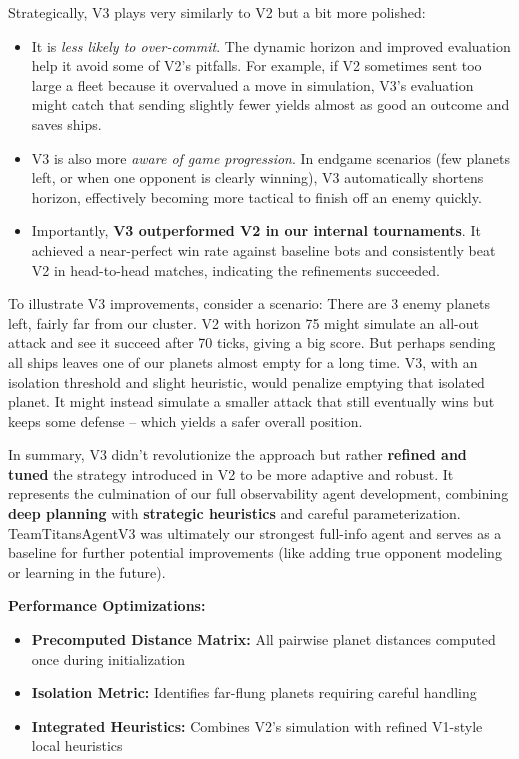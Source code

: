 \documentclass[conference]{IEEEtran}
\begin{document}
Strategically, V3 plays very similarly to V2 but a bit more polished:

\begin{itemize}
\item It is \textit{less likely to over-commit}. The dynamic horizon and improved evaluation help it avoid some of V2's pitfalls. For example, if V2 sometimes sent too large a fleet because it overvalued a move in simulation, V3's evaluation might catch that sending slightly fewer yields almost as good an outcome and saves ships.

\item V3 is also more \textit{aware of game progression}. In endgame scenarios (few planets left, or when one opponent is clearly winning), V3 automatically shortens horizon, effectively becoming more tactical to finish off an enemy quickly.

\item Importantly, \textbf{V3 outperformed V2 in our internal tournaments}. It achieved a near-perfect win rate against baseline bots and consistently beat V2 in head-to-head matches, indicating the refinements succeeded.
\end{itemize}

To illustrate V3 improvements, consider a scenario: There are 3 enemy planets left, fairly far from our cluster. V2 with horizon 75 might simulate an all-out attack and see it succeed after 70 ticks, giving a big score. But perhaps sending all ships leaves one of our planets almost empty for a long time. V3, with an isolation threshold and slight heuristic, would penalize emptying that isolated planet. It might instead simulate a smaller attack that still eventually wins but keeps some defense -- which yields a safer overall position.

In summary, V3 didn't revolutionize the approach but rather \textbf{refined and tuned} the strategy introduced in V2 to be more adaptive and robust. It represents the culmination of our full observability agent development, combining \textbf{deep planning} with \textbf{strategic heuristics} and careful parameterization. TeamTitansAgentV3 was ultimately our strongest full-info agent and serves as a baseline for further potential improvements (like adding true opponent modeling or learning in the future).

\textbf{Performance Optimizations:}
\begin{itemize}
\item \textbf{Precomputed Distance Matrix:} All pairwise planet distances computed once during initialization
\item \textbf{Isolation Metric:} Identifies far-flung planets requiring careful handling
\item \textbf{Integrated Heuristics:} Combines V2's simulation with refined V1-style local heuristics
\end{itemize}
\end{document}
